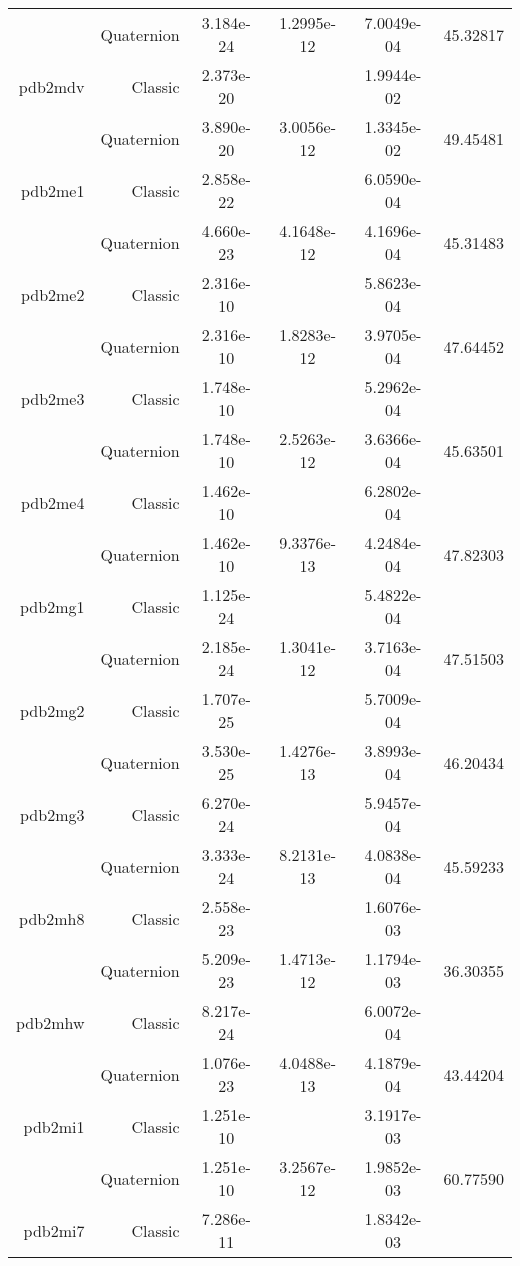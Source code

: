 \begin{xltabular}{\textwidth}{r|rS[table-format=1.3e+2]S[table-format=1.4e+2]S[table-format=1.4e+2]S[table-format=-1.5]}
& Quaternion & 3.184e-24 & 1.2995e-12 & 7.0049e-04 & 45.32817\\  \addlinespace
pdb2mdv & Classic & 2.373e-20 &  & 1.9944e-02 & \\
& Quaternion & 3.890e-20 & 3.0056e-12 & 1.3345e-02 & 49.45481\\  \addlinespace
pdb2me1 & Classic & 2.858e-22 &  & 6.0590e-04 & \\
& Quaternion & 4.660e-23 & 4.1648e-12 & 4.1696e-04 & 45.31483\\  \addlinespace
pdb2me2 & Classic & 2.316e-10 &  & 5.8623e-04 & \\
& Quaternion & 2.316e-10 & 1.8283e-12 & 3.9705e-04 & 47.64452\\  \addlinespace
pdb2me3 & Classic & 1.748e-10 &  & 5.2962e-04 & \\
& Quaternion & 1.748e-10 & 2.5263e-12 & 3.6366e-04 & 45.63501\\  \addlinespace
pdb2me4 & Classic & 1.462e-10 &  & 6.2802e-04 & \\
& Quaternion & 1.462e-10 & 9.3376e-13 & 4.2484e-04 & 47.82303\\  \addlinespace
pdb2mg1 & Classic & 1.125e-24 &  & 5.4822e-04 & \\
& Quaternion & 2.185e-24 & 1.3041e-12 & 3.7163e-04 & 47.51503\\  \addlinespace
pdb2mg2 & Classic & 1.707e-25 &  & 5.7009e-04 & \\
& Quaternion & 3.530e-25 & 1.4276e-13 & 3.8993e-04 & 46.20434\\  \addlinespace
pdb2mg3 & Classic & 6.270e-24 &  & 5.9457e-04 & \\
& Quaternion & 3.333e-24 & 8.2131e-13 & 4.0838e-04 & 45.59233\\  \addlinespace
pdb2mh8 & Classic & 2.558e-23 &  & 1.6076e-03 & \\
& Quaternion & 5.209e-23 & 1.4713e-12 & 1.1794e-03 & 36.30355\\  \addlinespace
pdb2mhw & Classic & 8.217e-24 &  & 6.0072e-04 & \\
& Quaternion & 1.076e-23 & 4.0488e-13 & 4.1879e-04 & 43.44204\\  \addlinespace
pdb2mi1 & Classic & 1.251e-10 &  & 3.1917e-03 & \\
& Quaternion & 1.251e-10 & 3.2567e-12 & 1.9852e-03 & 60.77590\\  \addlinespace
pdb2mi7 & Classic & 7.286e-11 &  & 1.8342e-03 & \\

\end{xltabular}
